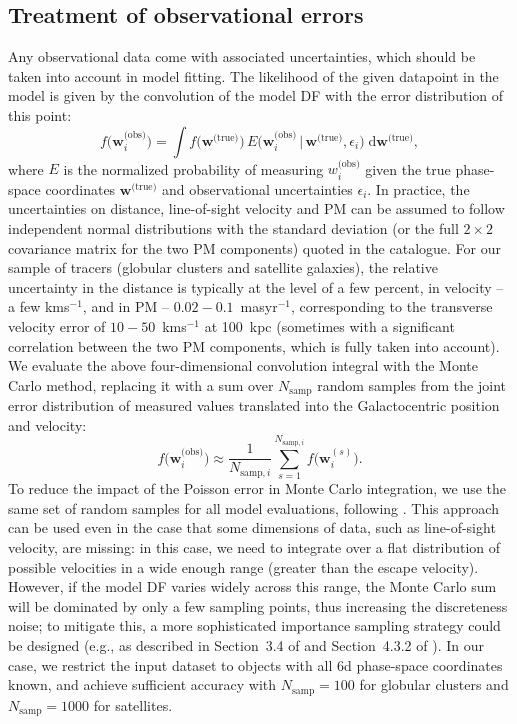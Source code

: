\documentclass[usenatbib,fleqn]{mnras}
\newcommand{\kms}{km\:s$^{-1}$\xspace}
\newcommand{\masyr}{mas\:yr$^{-1}$\xspace}
\begin{document}
\subsection{Treatment of observational errors}  \label{sec:obs_errors}

Any observational data come with associated uncertainties, which should be taken into account in model fitting. The likelihood of the given datapoint in the model is given by the convolution of the model DF with the error distribution of this point:
\begin{equation}  \label{eq:error_convolution_integral}
f\big( \boldsymbol w^\text{(obs)}_i \big) =
\int f\big( \boldsymbol w^\text{(true)} \big)\, E\big( \boldsymbol w^\text{(obs)}_i \,|\, \boldsymbol w^\text{(true)}, \epsilon_i \big)\; \mathrm{d}\boldsymbol w^\text{(true)} ,
\end{equation}
where $E$ is the normalized probability of measuring $w^\text{(obs)}_i$ given the true phase-space coordinates $\boldsymbol w^\text{(true)}$ and observational uncertainties $\epsilon_i$. In practice, the uncertainties on distance, line-of-sight velocity and PM can be assumed to follow independent normal distributions with the standard deviation (or the full $2\times2$ covariance matrix for the two PM components) quoted in the catalogue. For our sample of tracers (globular clusters and satellite galaxies), the relative uncertainty in the distance is typically at the level of a few percent, in velocity -- a few \kms, and in PM -- $0.02-0.1$~\masyr, corresponding to the transverse velocity error of $10-50$~\kms at 100~kpc (sometimes with a significant correlation between the two PM components, which is fully taken into account). We evaluate the above four-dimensional convolution integral with the Monte Carlo method, replacing it with a sum over $N_\text{samp}$ random samples from the joint error distribution of measured values translated into the Galactocentric position and velocity:
\begin{equation}  \label{eq:error_convolution_sum}
f\big( \boldsymbol w^\text{(obs)}_i \big) \approx \frac{1}{N_{\text{samp},i}}
\sum_{s=1}^{N_{\text{samp},i}} f\big( \boldsymbol w^{(s)}_i \big).
\end{equation}
To reduce the impact of the Poisson error in Monte Carlo integration, we use the same set of random samples for all model evaluations, following \citet{McMillan2013}. This approach can be used even in the case that some dimensions of data, such as line-of-sight velocity, are missing: in this case, we need to integrate over a flat distribution of possible velocities in a wide enough range (greater than the escape velocity). However, if the model DF varies widely across this range, the Monte Carlo sum will be dominated by only a few sampling points, thus increasing the discreteness noise; to mitigate this, a more sophisticated importance sampling strategy could be designed (e.g., as described in Section~3.4 of \citealt{Read2021} and Section~4.3.2 of \citealt{Hattori2021}). In our case, we restrict the input dataset to objects with all 6d phase-space coordinates known, and achieve sufficient accuracy with $N_\text{samp}=100$ for globular clusters and $N_\text{samp}=1000$ for satellites.
\end{document}
